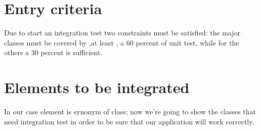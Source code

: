 \section{Entry criteria}
Due to start an integration test two constraints must be satisfied:
the major classes must be covered by ,at least , a 60 percent of unit test, 
while for the others a 30 percent is sufficient.

\section{Elements to be integrated}
In our case element is synonym of class; now we're going to show the classes that
need integration test in order to be sure that our application will work correctly.
